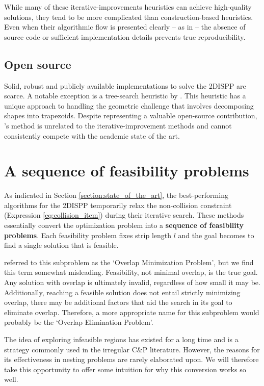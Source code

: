 \documentclass[preprint, 11pt, authoryear]{elsarticle}
\begin{document}
While many of these iterative-improvements heuristics can achieve high-quality solutions, they tend to be more complicated than construction-based heuristics.
Even when their algorithmic flow is presented clearly -- as in \citet{sato2019raster} -- the absence of source code or sufficient implementation details prevents true reproducibility.

\subsection*{Open source}
Solid, robust and publicly available implementations to solve the 2DISPP are scarce.
A notable exception is a tree-search heuristic by \citet{fontan}.
This heuristic has a unique approach to handling the geometric challenge that involves decomposing shapes into trapezoids.  Despite representing a valuable open-source contribution, \citet{fontan}'s method is unrelated to the iterative-improvement methods and cannot consistently compete with the academic state of the art.

\section{A sequence of feasibility problems} \label{section:feasibility_problem}
As indicated in Section \ref{section:state_of_the_art}, the best-performing algorithms for the 2DISPP temporarily relax the non-collision constraint (Expression \ref{eq:collision_item}) during their iterative search.
These methods essentially convert the optimization problem into a \textbf{sequence of feasibility problems}.
Each feasibility problem fixes strip length $l$ and the goal becomes to find a single solution that is feasible. 

\citet{umetani2009solving} referred to this subproblem as the `Overlap Minimization Problem', but we find this term somewhat misleading.
Feasibility, not minimal overlap, is the true goal.
Any solution with overlap is ultimately invalid, regardless of how small it may be.
Additionally, reaching a feasible solution does not entail strictly minimizing overlap, there may be additional factors that aid the search in its goal to eliminate overlap.
Therefore, a more appropriate name for this subproblem would probably be the `Overlap Elimination Problem'.

The idea of exploring infeasible regions has existed for a long time \citep{glover1989tabu} and is a strategy commonly used in the irregular C\&P literature. 
However, the reasons for its effectiveness in nesting problems are rarely elaborated upon. 
We will therefore take this opportunity to offer some intuition for why this conversion works so well.
\end{document}
